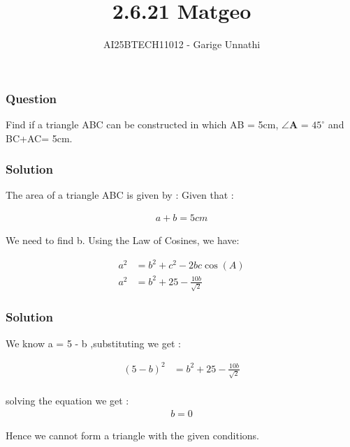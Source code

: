 \documentclass{beamer}
\title{2.6.21 Matgeo}
\author{AI25BTECH11012 - Garige Unnathi}
\date{}
\begin{document}
\frame{\titlepage}

\begin{frame}
\frametitle{Question}
Find if a triangle ABC can be constructed in which AB = 5cm, $\angle \textbf{A}$ = $45^\circ$ and BC+AC= 5cm.
\end{frame}


\begin{frame}
\frametitle{Solution}
The area of a triangle ABC is given by :
Given that : 

\begin{align*}
  a + b = 5 cm
\end{align*}

We need to find b. Using the Law of Cosines, we have:


\begin{align}
 a^2 &= b^2 + c^2 - 2bc \cos(A) \\
 a^2 &= b^2 + 25 - \frac{10b}{\sqrt{2}}
 \end{align}




\end{frame}



\begin{frame}
\frametitle{Solution}
We know a = 5 - b ,substituting we get :

\begin{align}
 (5 - b)^2 &= b^2 + 25 - \frac{10b}{\sqrt{2}}\\
 \end{align}

solving the equation we get :
\begin{align}
b = 0
\end{align}



\bigskip
Hence we cannot form a triangle with the given conditions.

\end{frame}
\end{document}
